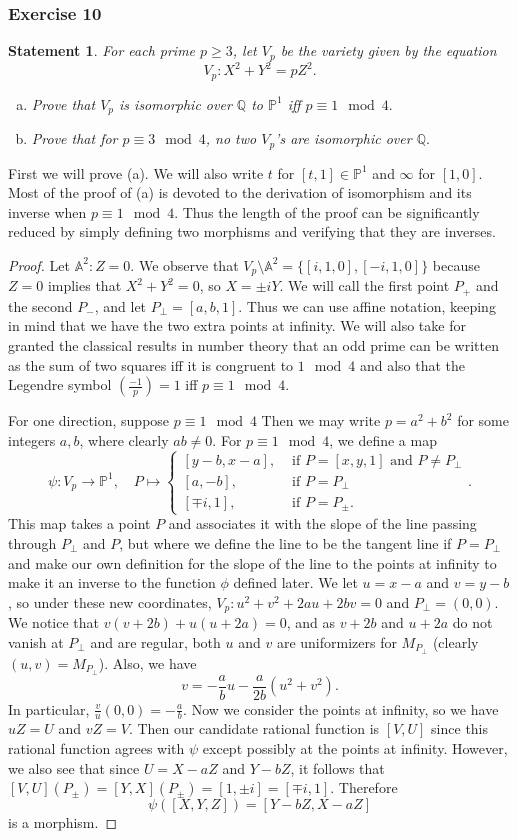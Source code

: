 \documentclass{article}
\theoremstyle{customplain}
\theoremstyle{customdef}
\newtheorem*{customexer}{Statement}
\newcommand{\tocexercise}[2]{%
\phantomsection
  \subsubsection*{#1}%
  \addcontentsline{toc}{subsubsection}{\texorpdfstring{#1}{Exercise}}%
  \begin{customexer}
  #2
  \end{customexer}
}
\newcommand{\leg}[2]{\genfrac{(}{)}{}{}{#1}{#2}} %
\newcommand{\A}{\mathbb{A}}
\newcommand{\Q}{\mathbb{Q}}
\renewcommand{\P}{\mathbb{P}}
\theoremstyle{definition} %
\renewcommand{\ge}{\geqslant}
\begin{document}
\tocexercise{Exercise 10}{
For each prime $p\ge 3$, let $V_p$ be the variety given by the equation
\[
V_p: X^2+Y^2 = pZ^2.
\] 
\begin{enumerate}[(a)]
    \item Prove that $V_p$ is isomorphic over $\Q$ to $\P^1$ iff $p\equiv 1 \mod 4.$
    \item Prove that for $p\equiv 3 \mod 4$, no two $V_p$'s are isomorphic over $\Q.$
\end{enumerate}
}
First we will prove (a). We will also write $t$ for $[t,1]\in \P^1$ and $\infty$ for $[1,0]$. Most of the proof of (a) is devoted to the derivation of isomorphism and its inverse when $p\equiv 1 \mod 4.$ Thus the length of the proof can be significantly reduced by simply defining two morphisms and verifying that they are inverses.
\begin{proof}
    Let $\A^2: Z=0.$ We observe that $V_p\setminus \A^2=\{[i, 1, 0], [-i, 1, 0]\}$ because $Z=0$ implies that $X^2+Y^2=0$, so $X=\pm i Y$. We will call the first point $P_+$ and the second $P_-$, and let $P_\perp=[a,b,1]$. Thus we can use affine notation, keeping in mind that we have the two extra points at infinity. We will also take for granted the classical results in number theory that an odd prime can be written as the sum of two squares iff it is congruent to $1\mod 4$ and also that the Legendre symbol $\leg{-1}{p} = 1$ iff $p\equiv 1 \mod 4$.

    For one direction, suppose $p\equiv 1\mod 4$  Then we may write $p=a^2+b^2$ for some integers $a,b$, where clearly $ab\ne 0$.
    For $p\equiv 1 \mod 4$, we define a map $$\psi: V_p \to \P^1, \quad P\mapsto \begin{cases}
        [ y-b, x-a], & \text{ if } P=[x,y,1] \text{ and } P\ne P_\perp\\
        [a, -b], & \text { if } P=P_\perp\\
        [\mp i, 1], & \text{ if } P=P_\pm.
        
    \end{cases}.$$ This map takes a point $P$ and associates it with the slope of the line passing through $P_\perp$ and $P$, but where we define the line to be the tangent line if $P=P_\perp$ and make our own definition for the slope of the line to the points at infinity to make it an inverse to the function $\phi$ defined later. We let $u=x-a$ and $v=y-b$, so under these new coordinates, $V_p: u^2+v^2+2au+2bv=0$ and $P_\perp = (0,0).$ We notice that $v(v+2b)+u(u+2a)=0$, and as $v+2b$ and $u+2a$ do not vanish at $P_\perp$ and are regular, both $u$ and $v$ are uniformizers for $M_{P_\perp}$ (clearly $(u,v)=M_{P_\perp}$). Also, we have
    \[
    v=-\frac{a}{b}u-\frac{a}{2b}(u^2+v^2).
    \]
    In particular, $\frac{v}{u}(0,0) = -\frac{a}{b}$. Now we consider the points at infinity, so we have $uZ=U$ and $vZ=V$. Then our candidate rational function is $[V,U]$ since this rational function agrees with $\psi$ except possibly at the points at infinity. However, we also see that since $U=X-aZ$ and $Y-bZ$, it follows that $[V,U](P_\pm) = [Y,X](P_\pm)=[1, \pm i] = [\mp i, 1]$. Therefore 
    \[
    \psi([X,Y,Z]) = [Y-bZ, X-aZ]
    \]
    is a morphism.
    

\end{proof}
\end{document}
